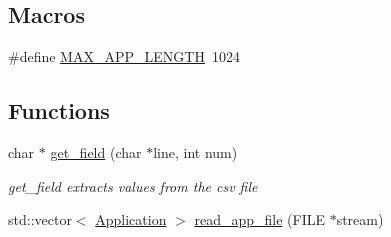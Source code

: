 \subsection*{Macros}
\begin{DoxyCompactItemize}
\item 
\#define \hyperlink{read__app__file_8hh_a7ed282204b454e197643642cd5168211}{M\-A\-X\-\_\-\-A\-P\-P\-\_\-\-L\-E\-N\-G\-T\-H}~1024
\end{DoxyCompactItemize}
\subsection*{Functions}
\begin{DoxyCompactItemize}
\item 
char $\ast$ \hyperlink{read__app__file_8hh_a83fa4dd89935ed1f044f0a3dec2677d8}{get\-\_\-field} (char $\ast$line, int num)
\begin{DoxyCompactList}\small\item\em get\-\_\-field extracts values from the csv file \end{DoxyCompactList}\item 
std\-::vector$<$ \hyperlink{classApplication}{Application} $>$ \hyperlink{read__app__file_8hh_abea28f70a4f365abefd8b7aa3f0aa00e}{read\-\_\-app\-\_\-file} (F\-I\-L\-E $\ast$stream)
\end{DoxyCompactItemize}
